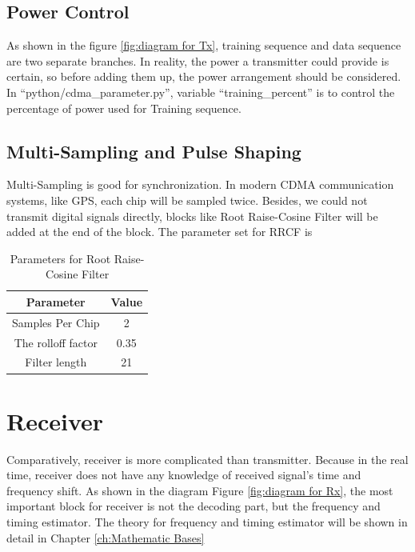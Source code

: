 \documentclass[a4paper]{report}
\begin{document}
\subsection{Power Control} %
\label{sub:power_control}
As shown in the figure \ref{fig:diagram for Tx}, training sequence and data sequence are two separate branches. In reality, the power a transmitter could provide is certain, so before adding them up, the power arrangement should be considered. In ``python/cdma\_parameter.py'', variable ``training\_percent'' is to control the percentage of power used for Training sequence. 

\subsection{Multi-Sampling and Pulse Shaping} %
\label{sub:multi_sampling}
Multi-Sampling is good for synchronization. In modern CDMA communication systems, like GPS, each chip will be sampled twice. Besides, we could not transmit digital signals directly, blocks like Root Raise-Cosine Filter will be added at the end of the block. The parameter set for RRCF is 
\begin{table}[ht]
	\centering
	\caption{Parameters for Root Raise-Cosine Filter}
	\begin{tabular}{cc}
	\hline
		Parameter 			& 	Value 	\\ \hline
		Samples Per Chip 	& 	2 		\\
		The rolloff factor 	& 	0.35 	\\
		Filter length 		& 	21 		\\ \hline
	\end{tabular}
\end{table}

\section{Receiver} %
\label{sec:receiver}

Comparatively, receiver is more complicated than transmitter. Because in the real time, receiver does not have any knowledge of received signal's time and frequency shift. As shown in the diagram Figure \ref{fig:diagram for Rx},  the most important block for receiver is not the decoding part, but the frequency and timing estimator. The theory for frequency and timing estimator will be shown in detail in Chapter \ref{ch:Mathematic Bases}
\end{document}
